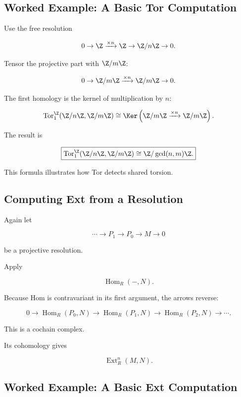 \subsection{Worked Example: A Basic Tor Computation}
\label{subsec:worked-tor}

Use the free resolution

\[ 0\to\Z\xrightarrow{\times n}\Z\to\Z/n\Z\to0. \]

Tensor the projective part with \(\Z/m\Z\):

\[ 0\to\Z/m\Z\xrightarrow{\times n}\Z/m\Z\to0. \]

The first homology is the kernel of multiplication by \(n\):

\[ \operatorname{Tor}_1^\Z(\Z/n\Z,\Z/m\Z)
\cong\Ker\left(
\Z/m\Z\xrightarrow{\times n}\Z/m\Z
\right). \]

The result is

\[ \boxed{
\operatorname{Tor}_1^\Z(\Z/n\Z,\Z/m\Z)
\cong\Z/\gcd(n,m)\Z.} \]

This formula illustrates how Tor detects shared torsion.

\subsection{Computing Ext from a Resolution}
\label{subsec:computing-ext}

Again let

\[ \cdots\to P_1\to P_0\to M\to0 \]

be a projective resolution.

Apply

\[ \operatorname{Hom}_R(-,N). \]

Because Hom is contravariant in its first argument, the arrows reverse:

\[ 0\to\operatorname{Hom}_R(P_0,N)
\to\operatorname{Hom}_R(P_1,N)
\to\operatorname{Hom}_R(P_2,N)\to\cdots. \]

This is a cochain complex.

Its cohomology gives

\[ \operatorname{Ext}_R^n(M,N). \]

\subsection{Worked Example: A Basic Ext Computation}
\label{subsec:worked-ext}

